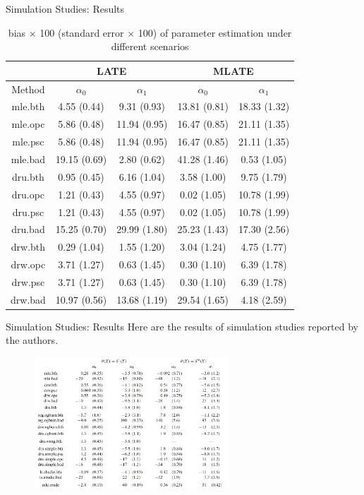 \documentclass[aspectratio=169,xcolor=dvipsnames]{beamer}
\begin{document}
\begin{frame}{Simulation Studies: Results}
\begin{table}
\footnotesize
\centering
\begin{tabular}[h]{c|cc|cc}
\toprule
    & \multicolumn{2}{c|}{LATE} &\multicolumn{2}{c}{MLATE}\\
\midrule
    Method & $\alpha_0$ & $\alpha_1$ & $\alpha_0$ & $\alpha_1$\\
\midrule
    mle.bth&4.55 (0.44) & 9.31 (0.93)&13.81 (0.81) & 18.33 (1.32)\\
    mle.opc&5.86 (0.48) & 11.94 (0.95)&16.47 (0.85) & 21.11 (1.35)\\
    mle.psc&5.86 (0.48) & 11.94 (0.95)&16.47 (0.85) & 21.11 (1.35)\\
    mle.bad&19.15 (0.69) & 2.80 (0.62)&41.28 (1.46) & 0.53 (1.05)\\
    dru.bth&0.95 (0.45) & 6.16 (1.04)&3.58 (1.00) & 9.75 (1.79)\\
    dru.opc&1.21 (0.43) & 4.55 (0.97)&0.02 (1.05) & 10.78 (1.99)\\
    dru.psc&1.21 (0.43) & 4.55 (0.97)&0.02 (1.05) & 10.78 (1.99)\\
    dru.bad&15.25 (0.70) & 29.99 (1.80)&25.23 (1.43) & 17.30 (2.56)\\
    drw.bth&0.29 (1.04) & 1.55 (1.20)&3.04 (1.24) & 4.75 (1.77)\\
    drw.opc&3.71 (1.27) & 0.63 (1.45)&0.30 (1.10) & 6.39 (1.78)\\
    drw.psc&3.71 (1.27) & 0.63 (1.45)&0.30 (1.10) & 6.39 (1.78)\\
    drw.bad&10.97 (0.56) & 13.68 (1.19)&29.54 (1.65) & 4.18 (2.59)\\
\bottomrule
\end{tabular}
\caption{bias $\times$ 100 (standard error $\times$ 100) of parameter estimation under different scenarios}
\end{table}
\end{frame}
\begin{frame}{Simulation Studies: Results}
Here are the results of simulation studies reported by the authors.
\begin{figure}
\centering
\includegraphics[width=0.65\textwidth]{figure/simulation.png}
\end{figure}
\end{frame}
\end{document}
